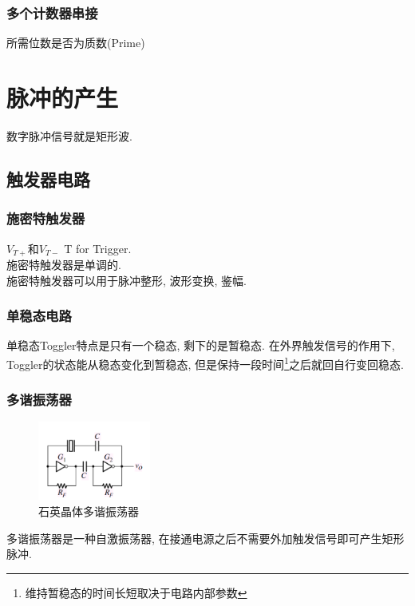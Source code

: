 \documentclass[scheme=chinese,a4paper]{report}
\begin{document}
\subsection{多个计数器串接}
所需位数是否为质数(Prime)
\chapter{脉冲的产生}
数字脉冲信号就是矩形波. 
\section{触发器电路}
\subsection{施密特触发器}
$V_{T+}$和$V_{T-}$ T for Trigger. \\
施密特触发器是单调的. \\
施密特触发器可以用于脉冲整形, 波形变换, 鉴幅. 
\subsection{单稳态电路}
单稳态Toggler特点是只有一个稳态, 剩下的是暂稳态. 在外界触发信号的作用下, Toggler的状态能从稳态变化到暂稳态, 但是保持一段时间\footnote{维持暂稳态的时间长短取决于电路内部参数}之后就回自行变回稳态. 
\subsection{多谐振荡器}
\begin{figure}[H]
\centering
\includegraphics[width=0.33\textwidth]{crystal_osc.png}
\caption{石英晶体多谐振荡器}
\end{figure}
多谐振荡器是一种自激振荡器, 在接通电源之后不需要外加触发信号即可产生矩形脉冲. 
\end{document}
